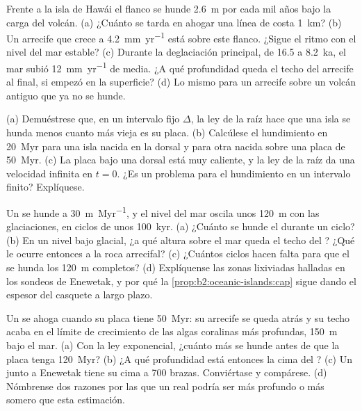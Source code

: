 \begin{exercise}[$\star\star$]\label{exo:b2:oceanic-islands:9}
Frente a la isla de Hawái el flanco se hunde \qty{2.6}{m} por cada mil años bajo la carga del
volcán. (a) ¿Cuánto se tarda en ahogar una línea de costa \qty{1}{km}? (b) Un arrecife que crece a
\qty{4.2}{mm.yr^{-1}} está sobre este flanco. ¿Sigue el ritmo con el nivel del mar estable? (c) Durante la
deglaciación principal, de 16.5 a \qty{8.2}{ka}, el mar subió \qty{12}{mm.yr^{-1}} de media. ¿A qué
profundidad queda el techo del arrecife al final, si empezó en la superficie? (d) Lo mismo para un arrecife sobre
un volcán antiguo que ya no se hunde.
\end{exercise}

\begin{exercise}[$\star\star\star$]\label{exo:b2:oceanic-islands:10}
(a) Demuéstrese que, en un intervalo fijo $\Delta$, la ley de la raíz hace que una isla se hunda menos cuanto más vieja es su
placa. (b) Calcúlese el hundimiento en \qty{20}{Myr} para una isla nacida en la dorsal y para otra nacida
sobre una placa de \qty{50}{Myr}. (c) La placa bajo una dorsal está muy caliente, y la ley de la raíz da una
velocidad infinita en $t = 0$. ¿Es un problema para el hundimiento en un intervalo finito? Explíquese.
\end{exercise}

\begin{exercise}[$\star\star\star$]\label{exo:b2:oceanic-islands:11}
Un  se hunde a \qty{30}{m.Myr^{-1}}, y el nivel del mar oscila unos \qty{120}{m} con las
glaciaciones, en ciclos de unos \qty{100}{kyr}. (a) ¿Cuánto se hunde el  durante un ciclo? (b) En un
nivel bajo glacial, ¿a qué altura sobre el mar queda el techo del ? ¿Qué le ocurre entonces a la
roca arrecifal? (c) ¿Cuántos ciclos hacen falta para que el  se hunda los \qty{120}{m} completos?
(d) Explíquense las zonas lixiviadas halladas en los sondeos de Enewetak, y por qué la
\cref{prop:b2:oceanic-islands:cap} sigue dando el espesor del casquete a largo plazo.
\end{exercise}

\begin{exercise}[$\star\star\star$]\label{exo:b2:oceanic-islands:12}
Un  se ahoga cuando su placa tiene \qty{50}{Myr}: su arrecife se queda atrás y su techo acaba en el
límite de crecimiento de las algas coralinas más profundas, \qty{150}{m} bajo el mar. (a) Con la ley
exponencial, ¿cuánto más se hunde antes de que la placa tenga \qty{120}{Myr}? (b) ¿A qué profundidad está entonces
la cima del ? (c) Un  junto a Enewetak tiene su cima a 700 brazas. Conviértase y compárese.
(d) Nómbrense dos razones por las que un  real podría ser más profundo o más somero que esta estimación.
\end{exercise}

